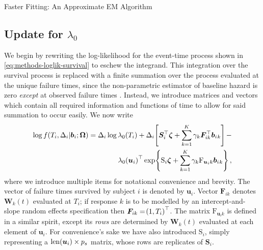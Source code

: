 \begin{chapter}{\label{cha:approx}Faster Fitting: An Approximate EM Algorithm}
  \subsection{Update for \texorpdfstring{$\lambda_0$}{basehaz}}\label{sec:approx-Mstep-l0}
  We begin by rewriting the log-likelihood for the event-time process shown in \eqref{eq:methods-loglik-survival} to eschew the integrand. This integration over the survival process is replaced with a finite summation over the process evaluated at the unique failure times, since the non-parametric estimator of baseline hazard is zero \textit{except} at observed failure times \citep{Henderson2000}. Instead, we introduce matrices and vectors which contain all required information and functions of time to allow for said summation to occur easily. We now write
  \begin{equation}
    \begin{aligned}
    \log f(T_i,\Delta_i|\bm{b}_i;\bm{\mathrm{\Omega}}) = \Delta_i\log\lambda_0(T_i)+\Delta_i\!\left[\bm{S}_i^\top\bm{\zeta} + \sum_{k=1}^K\gamma_k\bm{F}_{ik}^\top\bm{b}_i{_k}\right] - \\
    \qquad\qquad\qquad\lambda_0\!\left(\bm{u}_i\right)^\top\exp\!\left\{\mathrm{S}_i\bm{\zeta} + \sum_{k=1}^K\gamma_k\mathrm{F}_{\bm{u}_ik}\bm{b}_i{_k}\right\},
    \end{aligned}
    \label{eq:approx-Mstep-survrewrite}
  \end{equation}
  where we introduce multiple items for notational convenience and brevity. The vector of failure times survived by subject $i$ is denoted by $\bm{u}_i$. Vector $\bm{F}_{ik}$ denotes $\bm{W}_k(t)$ evaluated at $T_i$; if response $k$ is to be modelled by an intercept-and-slope random effects specification then $\bm{F}_{ik}=\!\left(1, T_i\right)^\top$. The matrix $\mathrm{F}_{\bm{u}_ik}$ is defined in a similar spirit, except its \textit{rows} are determined by $\bm{W}_k(t)$ evaluated at each element of $\bm{u}_i$. For convenience's sake we have also introduced $\mathrm{S}_i$, simply representing a $\mathrm{len}\!\left(\bm{u}_i\right)\times p_s$ matrix, whose rows are replicates of $\bm{S}_i$.
  

\end{chapter}
